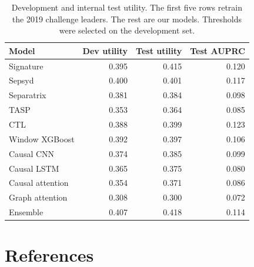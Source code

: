 \documentclass{article}
\begin{document}
\begin{table}[h]
\centering
\small
\begin{tabular}{lrrr}
\toprule
Model & Dev utility & Test utility & Test AUPRC\\
\midrule
Signature \cite{morrill2019signature} & 0.395 & 0.415 & 0.120\\
Sepsyd \cite{du2019sepsyd} & 0.400 & 0.401 & 0.117\\
Separatrix \cite{zabihi2019separatrix} & 0.381 & 0.384 & 0.098\\
TASP \cite{li2019tasp} & 0.353 & 0.364 & 0.085\\
CTL \cite{singh2019ctl} & 0.388 & 0.399 & 0.123\\
\midrule
Window XGBoost & 0.392 & 0.397 & 0.106\\
Causal CNN & 0.374 & 0.385 & 0.099\\
Causal LSTM & 0.365 & 0.375 & 0.080\\
Causal attention & 0.354 & 0.371 & 0.086\\
Graph attention & 0.308 & 0.300 & 0.072\\
Ensemble & 0.407 & 0.418 & 0.114\\
\bottomrule
\end{tabular}
\caption{Development and internal test utility. The first five rows retrain the 2019 challenge leaders. The rest are our models. Thresholds were selected on the development set.}
\label{tab:results}
\end{table}

\section*{References}

\renewcommand{\bibsection}{}   %
\medskip
{\small


}
\end{document}
